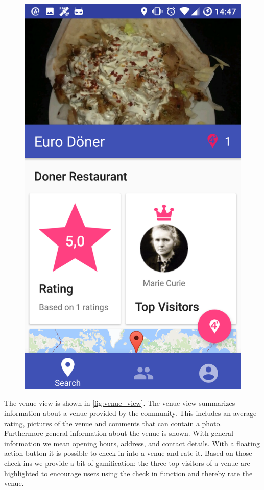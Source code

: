 \documentclass[11pt, accentcolor=tud1c]{tudreport}
\begin{document}
\begin{figure}[h]
\begin{minipage}{.3\textwidth}
  \includegraphics[width=.8\linewidth]{./res/venue.png}
  \label{fig:venue_view}
\end{minipage}%
\end{figure}



The venue view is shown in \autoref{fig:venue_view}. The venue view summarizes information about a venue provided by the community. This includes an average rating, pictures of the venue and comments that can contain a photo. Furthermore general information about the venue is shown. With general information we mean opening hours, address, and contact details. With a floating action button it is possible to check in into a venue and rate it. Based on those check ins we provide a bit of gamification: the three top visitors of a venue are highlighted to encourage users using the check in function and thereby rate the venue.
\end{document}
